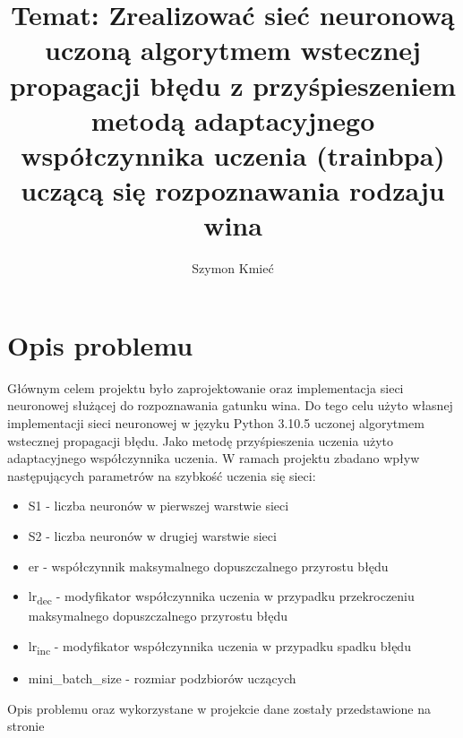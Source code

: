\documentclass[12pt,twoside]{article}
\title{Temat: Zrealizować sieć neuronową uczoną algorytmem wstecznej propagacji błędu z przyśpieszeniem metodą adaptacyjnego współczynnika uczenia (trainbpa)
uczącą się rozpoznawania rodzaju wina}
\author{Szymon Kmieć}
\begin{document}
\maketitle

\blankpage

\tableofcontents

\clearpage
\blankpage


\section{Opis problemu}
Głównym celem projektu było zaprojektowanie oraz implementacja sieci neuronowej służącej do rozpoznawania gatunku wina. Do tego celu użyto własnej implementacji sieci neuronowej w języku Python 3.10.5 uczonej algorytmem wstecznej propagacji błędu. Jako metodę przyśpieszenia uczenia użyto adaptacyjnego współczynnika uczenia. W ramach projektu zbadano wpływ następujących parametrów na szybkość uczenia się sieci: 

\begin{itemize}
\item S1 - liczba neuronów w pierwszej warstwie sieci
\item S2 - liczba neuronów w drugiej warstwie sieci
\item er - współczynnik maksymalnego dopuszczalnego przyrostu błędu
\item lr\textsubscript{dec} - modyfikator współczynnika uczenia w przypadku przekroczeniu maksymalnego dopuszczalnego przyrostu błędu
\item lr\textsubscript{inc} - modyfikator współczynnika uczenia w przypadku spadku błędu
\item mini\_batch\_size - rozmiar podzbiorów uczących
\end{itemize}

Opis problemu oraz wykorzystane w projekcie dane zostały przedstawione na stronie \cite{dane}

\clearpage
\end{document}
